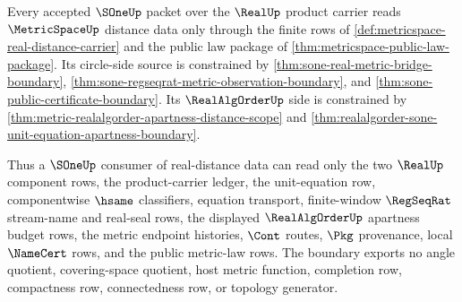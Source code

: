 \begin{theorem}
\label{thm:metricspace-sone-distance-source-boundary}
Every accepted $\SOneUp$ packet over the $\RealUp$ product carrier reads
$\MetricSpaceUp$ distance data only through the finite rows of
\autoref{def:metricspace-real-distance-carrier} and the public law package of
\autoref{thm:metricspace-public-law-package}. Its circle-side source is
constrained by \autoref{thm:sone-real-metric-bridge-boundary},
\autoref{thm:sone-regseqrat-metric-observation-boundary}, and
\autoref{thm:sone-public-certificate-boundary}. Its $\RealAlgOrderUp$ side is
constrained by \autoref{thm:metric-realalgorder-apartness-distance-scope} and
\autoref{thm:realalgorder-sone-unit-equation-apartness-boundary}.

Thus a $\SOneUp$ consumer of real-distance data can read only the two
$\RealUp$ component rows, the product-carrier ledger, the unit-equation row,
componentwise $\hsame$ classifiers, equation transport, finite-window
$\RegSeqRat$ stream-name and real-seal rows, the displayed
$\RealAlgOrderUp$ apartness budget rows, the metric endpoint histories,
$\Cont$ routes, $\Pkg$ provenance, local $\NameCert$ rows, and the public
metric-law rows. The boundary exports no angle quotient, covering-space
quotient, host metric function, completion row, compactness row, connectedness
row, or topology generator.
\end{theorem}
